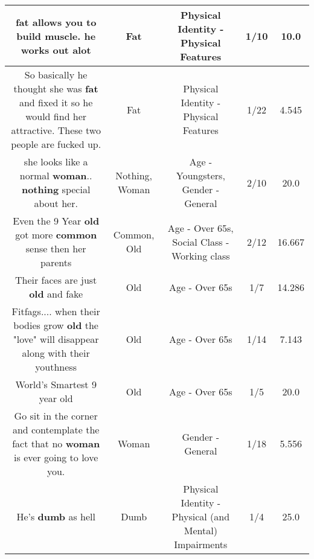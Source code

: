 \documentclass[11pt]{article}
\newlength\mylength
\begin{document}
\begin{center}
\begin{longtable}{|C{.65\mylength}|C{.30\mylength}|C{.12\mylength}|C{.12\mylength}|C{.12\mylength}|}
  \small fat allows you to build muscle. he works out alot\normalsize   & Fat & Physical Identity - Physical Features & 1/10 & 10.0 \\  \hline
  \small So basically he thought she was \textbf{fat} and fixed it so he would find her attractive. These two people are fucked up.\normalsize   & Fat & Physical Identity - Physical Features & 1/22 & 4.545 \\  \hline
  \small she looks like a normal \textbf{woman}.. \textbf{nothing} special about her.\normalsize   & Nothing, Woman & Age - Youngsters, Gender - General & 2/10 & 20.0 \\  \hline
  \small Even the 9 Year \textbf{old} got more \textbf{common} sense then her parents\normalsize   & Common, Old & Age - Over 65s, Social Class - Working class & 2/12 & 16.667 \\  \hline
  \small Their faces are just \textbf{old} and fake\normalsize   & Old & Age - Over 65s & 1/7 & 14.286 \\  \hline
  \small Fitfags.... when their bodies grow \textbf{old} the "love" will disappear along with their youthness\normalsize   & Old & Age - Over 65s & 1/14 & 7.143 \\  \hline
  \small World's Smartest 9 year old\normalsize   & Old & Age - Over 65s & 1/5 & 20.0 \\  \hline
  \small Go sit in the corner and contemplate the fact that no \textbf{woman} is ever going to love you.\normalsize   & Woman & Gender - General & 1/18 & 5.556 \\  \hline
  \small He's \textbf{dumb} as hell\normalsize   & Dumb & Physical Identity - Physical (and Mental) Impairments & 1/4 & 25.0 \\  \hline

\end{longtable}
\end{center}
\end{document}
